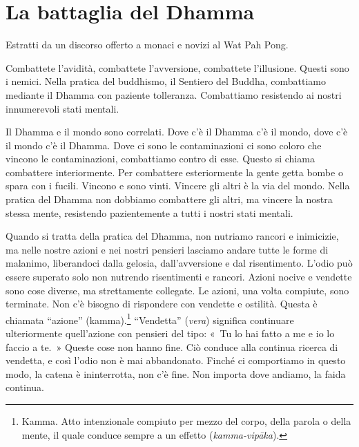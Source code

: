 \chapter{La battaglia del Dhamma}

\begin{openingQuote}
  \centering

  Estratti da un discorso offerto a monaci e novizi al Wat Pah Pong.
\end{openingQuote}

Combattete l'avidità, combattete l'avversione, combattete l'illusione.
Questi sono i nemici. Nella pratica del buddhismo, il Sentiero del
Buddha, combattiamo mediante il Dhamma con paziente tolleranza.
Combattiamo resistendo ai nostri innumerevoli stati mentali.

Il Dhamma e il mondo sono correlati. Dove c'è il Dhamma c'è il mondo,
dove c'è il mondo c'è il Dhamma. Dove ci sono le contaminazioni ci sono
coloro che vincono le contaminazioni, combattiamo contro di esse. Questo
si chiama combattere interiormente. Per combattere esteriormente la
gente getta bombe o spara con i fucili. Vincono e sono vinti. Vincere
gli altri è la via del mondo. Nella pratica del Dhamma non dobbiamo
combattere gli altri, ma vincere la nostra stessa mente, resistendo
pazientemente a tutti i nostri stati mentali.

Quando si tratta della pratica del Dhamma, non nutriamo rancori e
inimicizie, ma nelle nostre azioni e nei nostri pensieri lasciamo andare
tutte le forme di malanimo, liberandoci dalla gelosia, dall'avversione
e dal risentimento. L'odio può essere superato solo non nutrendo
risentimenti e rancori. Azioni nocive e vendette sono cose diverse, ma
strettamente collegate. Le azioni, una volta compiute, sono terminate.
Non c'è bisogno di rispondere con vendette e ostilità. Questa è chiamata
``azione'' (kamma).\footnote{Kamma. Atto intenzionale
  compiuto per mezzo del corpo, della parola o della mente, il quale
  conduce sempre a un effetto (\emph{kamma-vipāka}).} ``Vendetta''
(\emph{vera}) significa continuare ulteriormente quell'azione con
pensieri del tipo: «~Tu lo hai fatto a me e io lo faccio a te.~» Queste
cose non hanno fine. Ciò conduce alla continua ricerca di vendetta, e
così l'odio non è mai abbandonato. Finché ci comportiamo in questo modo,
la catena è ininterrotta, non c'è fine. Non importa dove andiamo, la
faida continua.

